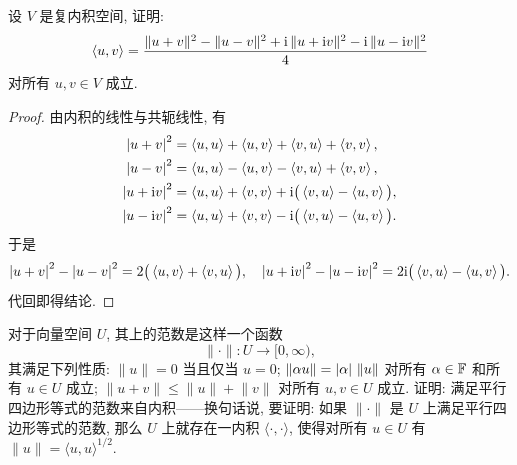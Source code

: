 \documentclass{article}
\begin{document}
\begin{problem}[6A-27]
设 $V$ 是复内积空间, 证明:
\[
\langle u, v \rangle
= \frac{\lVert u + v \rVert^2 - \lVert u - v \rVert^2 + \mathrm{i}\,\lVert u + \mathrm{i} v \rVert^2 - \mathrm{i}\,\lVert u - \mathrm{i} v \rVert^2}{4}
\]
对所有 $u, v \in V$ 成立.
\end{problem}

\begin{proof}
  由内积的线性与共轭线性, 有
  \begin{align*}
    \left|u+v\right|^2 &= \left\langle u, u \right\rangle+\left\langle u, v \right\rangle+\left\langle v, u \right\rangle+\left\langle v, v \right\rangle,\\
    \left|u-v\right|^2 &= \left\langle u, u \right\rangle-\left\langle u, v \right\rangle-\left\langle v, u \right\rangle+\left\langle v, v \right\rangle,\\
    \left|u+\mathrm{i} v\right|^2 &= \left\langle u, u \right\rangle+\left\langle v, v \right\rangle+\mathrm{i}\big(\left\langle v, u \right\rangle-\left\langle u, v \right\rangle\big),\\
    \left|u-\mathrm{i} v\right|^2 &= \left\langle u, u \right\rangle+\left\langle v, v \right\rangle-\mathrm{i}\big(\left\langle v, u \right\rangle-\left\langle u, v \right\rangle\big).
  \end{align*}
  于是
  \[
    \left|u+v\right|^2-\left|u-v\right|^2=2\big(\left\langle u, v \right\rangle+\left\langle v, u \right\rangle\big),\quad
    \left|u+\mathrm{i} v\right|^2-\left|u-\mathrm{i} v\right|^2=2\mathrm{i}\big(\left\langle v, u \right\rangle-\left\langle u, v \right\rangle\big).
  \]
  代回即得结论.
\end{proof}



\begin{problem}[6A-28]
对于向量空间 $U$, 其上的范数是这样一个函数
\[
\lVert \cdot \rVert : U \to [0, \infty),
\]
其满足下列性质: $\lVert u \rVert = 0$ 当且仅当 $u = 0$; $\lVert \alpha u \rVert = \left|\alpha\right|\,\lVert u \rVert$ 对所有 $\alpha \in \mathbb{F}$ 和所有 $u \in U$ 成立;
$\lVert u + v \rVert \le \lVert u \rVert + \lVert v \rVert$ 对所有 $u, v \in U$ 成立.
证明: 满足平行四边形等式的范数来自内积——换句话说, 要证明: 如果 $\lVert \cdot \rVert$ 是 $U$ 上满足平行四边形等式的范数, 那么 $U$ 上就存在一内积 $\langle \cdot, \cdot \rangle$, 使得对所有 $u \in U$ 有 $\lVert u \rVert = \langle u, u \rangle^{1/2}$.
\end{problem}
\end{document}
